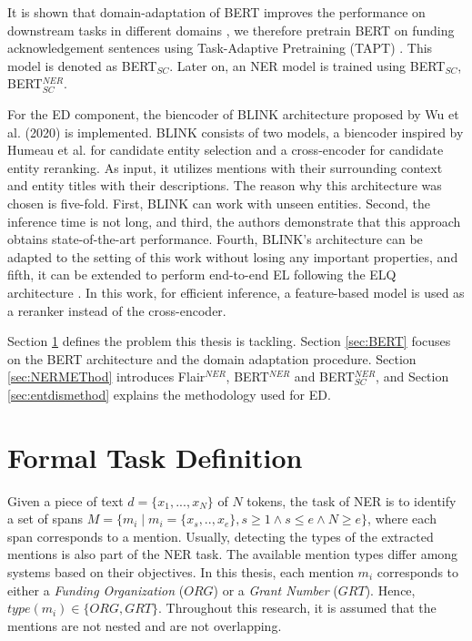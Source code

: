 \documentclass{report}
\theoremstyle{definition}
\theoremstyle{remark}
\begin{document}
It is shown that domain-adaptation of BERT improves the performance on downstream tasks in different domains \cite{DontStop,exBERT,quote3}, we therefore pretrain BERT on funding acknowledgement sentences using Task-Adaptive Pretraining (TAPT) \cite{DontStop}. This model is denoted as BERT$_{SC}$. Later on, an NER model is trained using BERT$_{SC}$, BERT$_{SC}^{NER}$. 

For the ED component, the biencoder of BLINK architecture proposed by Wu et al. (2020) \cite{scalablezeroshot} is implemented. BLINK consists of two models, a biencoder inspired by Humeau et al. \cite{polyencoder} for candidate entity selection and a cross-encoder \cite{polyencoder} for candidate entity reranking. As input, it utilizes mentions with their surrounding context and entity titles with their descriptions. The reason why this architecture was chosen is five-fold. First, BLINK can work with unseen entities. Second, the inference time is not long, and third, the authors demonstrate that this approach obtains state-of-the-art performance. Fourth, BLINK's architecture can be adapted to the setting of this work without losing any important properties, and fifth, it can be extended to perform end-to-end EL following the ELQ architecture \cite{elq}. In this work, for efficient inference, a feature-based model is used as a reranker instead of the cross-encoder.

Section \ref{sec:taskdef} defines the problem this thesis is tackling. Section \ref{sec:BERT} focuses on the BERT architecture and the domain adaptation procedure. Section \ref{sec:NERMEThod} introduces Flair$^{NER}$, BERT$^{NER}$ and BERT$_{SC}^{NER}$, and Section \ref{sec:entdismethod} explains the methodology used for ED.


\section{Formal Task Definition}
\label{sec:taskdef}
Given a piece of text $d=\{x_1,...,x_N\}$ of $N$ tokens, the task of NER is to identify a set of spans $M = \{m_i \mid m_i = \{x_s,..,x_e\}, s \geq 1 \land s\leq e \land N \geq e\}$, where each span corresponds to a mention. Usually, detecting the types of the extracted mentions is also part of the NER task. The available mention types differ among systems based on their objectives. In this thesis, each mention $m_i$ corresponds to either a \textit{Funding Organization} ($ORG$)  or a \textit{Grant Number} ($GRT$). Hence, $type(m_i) \in \{ORG,GRT\}$. Throughout this research, it is assumed that the mentions are not nested and are not overlapping.
\end{document}
